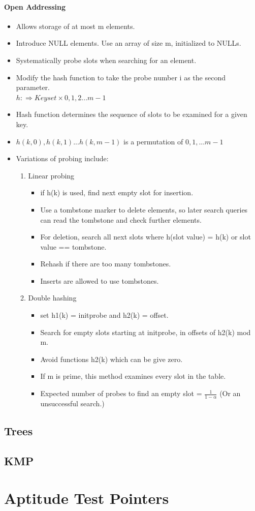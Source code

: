 \documentclass{report}
\begin{document}
\subsubsection{Open Addressing}
\begin{itemize}
\item Allows storage of at most m elements.
\item Introduce NULL elements. Use an array of size m, initialized to NULLs.
\item Systematically probe slots when searching for an element.
\item Modify the hash function to take the probe number i as the second parameter.\\
$h:\Longrightarrow Keyset \times {0, 1, 2 ... m-1}$
\item Hash function determines the sequence of slots to be examined for a given key.
\item ${h(k,0), h(k,1)...h(k,m-1)}$ is a permutation of ${0,1, ... m-1}$
\item Variations of probing include:
\begin{enumerate}
    \item Linear probing
    \begin{itemize}
        \item if h(k) is used, find next empty slot for insertion.
        \item Use a tombstone marker to delete elements, so later search queries can read the tombstone and check further elements.
        \item For deletion, search all next slots where h(slot value) = h(k) or slot value == tombstone.
        \item Rehash if there are too many tombstones.
        \item Inserts are allowed to use tombstones.
    \end{itemize}
    \item Double hashing
    \begin{itemize}
        \item set h1(k) = initprobe and h2(k) = offset.
        \item Search for empty slots starting at initprobe, in offsets of h2(k) mod m.
        \item Avoid functions h2(k) which can be give zero.
        \item If m is prime, this method examines every slot in the table.
        \item Expected number of probes to find an empty slot = $\frac{1}{1-\alpha}$ (Or an unsuccessful search.)
    \end{itemize}
\end{enumerate}
\end{itemize}
\section{Trees}

\section{KMP}
\subsection{}
\chapter{Aptitude Test Pointers}

\end{document}
